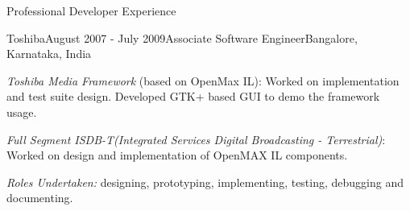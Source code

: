 \documentclass{resume} %
\begin{document}
\begin{rSection}{Professional Developer Experience}
\begin{rSubsection}{Toshiba}{August 2007 - July 2009}{Associate Software Engineer}{Bangalore, Karnataka, India}
\setlength{\itemindent}{.1in}
\item
	\emph{Toshiba Media Framework} (based on OpenMax IL): Worked on implementation and test suite design. Developed GTK+ based GUI to demo the framework usage.
\item
	\emph{Full Segment ISDB-T(Integrated Services Digital Broadcasting - Terrestrial)}: Worked on design and implementation of OpenMAX IL components.

\emph{Roles Undertaken:} designing, prototyping, implementing, testing, debugging and documenting.
\end{rSubsection}


\end{rSection}
\end{document}
